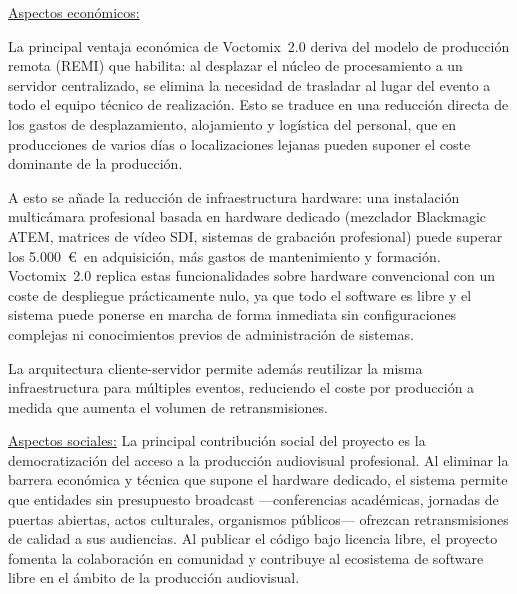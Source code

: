 \vspace{0.15cm}
\noindent\underline{Aspectos económicos:}
\normalsize{ La principal ventaja económica de Voctomix~2.0 deriva del modelo de producción
remota (REMI) que habilita: al desplazar el núcleo de procesamiento a un servidor centralizado,
se elimina la necesidad de trasladar al lugar del evento a todo el equipo técnico de realización.
Esto se traduce en una reducción directa de los gastos de desplazamiento, alojamiento y
logística del personal, que en producciones de varios días o localizaciones lejanas pueden
suponer el coste dominante de la producción.

A esto se añade la reducción de infraestructura hardware: una instalación multicámara profesional
basada en hardware dedicado (mezclador Blackmagic ATEM, matrices de vídeo SDI, sistemas de
grabación profesional) puede superar los 5.000~\euro\ en adquisición, más gastos de mantenimiento
y formación. Voctomix~2.0 replica estas funcionalidades sobre hardware convencional con un coste
de despliegue prácticamente nulo, ya que todo el software es libre y el sistema puede
ponerse en marcha de forma inmediata sin configuraciones complejas ni conocimientos previos
de administración de sistemas.

La arquitectura cliente-servidor permite además reutilizar la misma infraestructura para múltiples
eventos, reduciendo el coste por producción a medida que aumenta el volumen de retransmisiones.}

\vspace{0.15cm}
\noindent\underline{Aspectos sociales:}
\normalsize{ La principal contribución social del proyecto es la democratización del acceso
a la producción audiovisual profesional. Al eliminar la barrera económica y técnica que supone el
hardware dedicado, el sistema permite que entidades sin presupuesto broadcast —conferencias
académicas, jornadas de puertas abiertas, actos culturales, organismos públicos— ofrezcan
retransmisiones de calidad a sus audiencias. Al publicar el código bajo licencia libre, el proyecto
fomenta la colaboración en comunidad y contribuye al ecosistema de software libre en el ámbito de
la producción audiovisual.}

